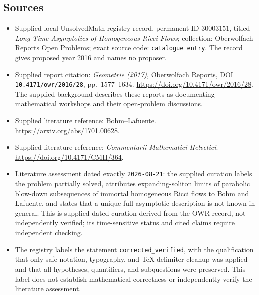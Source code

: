 \documentclass[11pt]{article}
\begin{document}
\subsection{Sources}
\begin{itemize}
\item Supplied local UnsolvedMath registry record, permanent ID \(30003151\), titled \emph{Long-Time Asymptotics of Homogeneous Ricci Flows}; collection: Oberwolfach Reports Open Problems; exact source code: \texttt{catalogue entry}. The record gives proposed year 2016 and names no proposer.
\item Supplied report citation: \emph{Geometrie (2017)}, Oberwolfach Reports, DOI \texttt{10.4171/owr/2016/28}, pp.\ 1577--1634. \url{https://doi.org/10.4171/owr/2016/28}. The supplied background describes these reports as documenting mathematical workshops and their open-problem discussions.
\item Supplied literature reference: Bohm--Lafuente. \url{https://arxiv.org/abs/1701.00628}.
\item Supplied literature reference: \emph{Commentarii Mathematici Helvetici}. \url{https://doi.org/10.4171/CMH/364}.
\item Literature assessment dated exactly \texttt{2026-08-21}: the supplied curation labels the problem partially solved, attributes expanding-soliton limits of parabolic blow-down subsequences of immortal homogeneous Ricci flows to Bohm and Lafuente, and states that a unique full asymptotic description is not known in general. This is supplied dated curation derived from the OWR record, not independently verified; its time-sensitive status and cited claims require independent checking.
\item The registry labels the statement \texttt{corrected\_verified}, with the qualification that only safe notation, typography, and TeX-delimiter cleanup was applied and that all hypotheses, quantifiers, and subquestions were preserved. This label does not establish mathematical correctness or independently verify the literature assessment.
\end{itemize}
\end{document}

